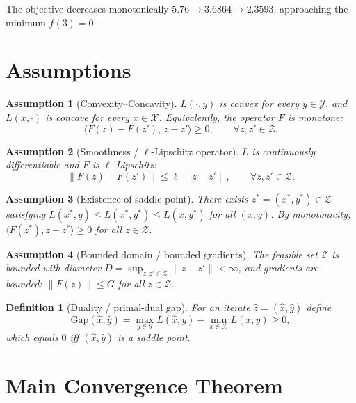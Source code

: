 \documentclass[11pt]{article}
\newtheorem{assumption}{Assumption}
\newtheorem{definition}{Definition}
\begin{document}
The objective decreases monotonically $5.76 \to 3.6864 \to 2.3593$, approaching
the minimum $f(3)=0$.

\section*{Assumptions}

\begin{assumption}[Convexity--Concavity]\label{as:cc}
$L(\cdot,y)$ is convex for every $y\in\mathcal{Y}$, and $L(x,\cdot)$ is concave
for every $x\in\mathcal{X}$. Equivalently, the operator $F$ is \emph{monotone}:
\[
\langle F(z) - F(z'),\, z - z'\rangle \ge 0, \qquad \forall z,z'\in\mathcal{Z}.
\]
\end{assumption}

\begin{assumption}[Smoothness / $\ell$-Lipschitz operator]\label{as:smooth}
$L$ is continuously differentiable and $F$ is $\ell$-Lipschitz:
\[
\|F(z) - F(z')\| \le \ell \, \|z - z'\|, \qquad \forall z,z'\in\mathcal{Z}.
\]
\end{assumption}

\begin{assumption}[Existence of saddle point]\label{as:saddle}
There exists $z^*=(x^*,y^*)\in\mathcal{Z}$ satisfying
$L(x^*,y)\le L(x^*,y^*)\le L(x,y^*)$ for all $(x,y)$. By monotonicity,
$\langle F(z^*), z-z^*\rangle \ge 0$ for all $z\in\mathcal{Z}$.
\end{assumption}

\begin{assumption}[Bounded domain / bounded gradients]\label{as:bound}
The feasible set $\mathcal{Z}$ is bounded with diameter
$D = \sup_{z,z'\in\mathcal{Z}}\|z-z'\|<\infty$, and gradients are bounded:
$\|F(z)\|\le G$ for all $z\in\mathcal{Z}$.
\end{assumption}

\begin{definition}[Duality / primal-dual gap]\label{def:gap}
For an iterate $\hat z=(\hat x,\hat y)$ define
\[
\mathrm{Gap}(\hat x,\hat y)
= \max_{y\in\mathcal{Y}} L(\hat x, y) - \min_{x\in\mathcal{X}} L(x,\hat y) \ge 0,
\]
which equals $0$ iff $(\hat x,\hat y)$ is a saddle point.
\end{definition}

\section*{Main Convergence Theorem}
\end{document}
